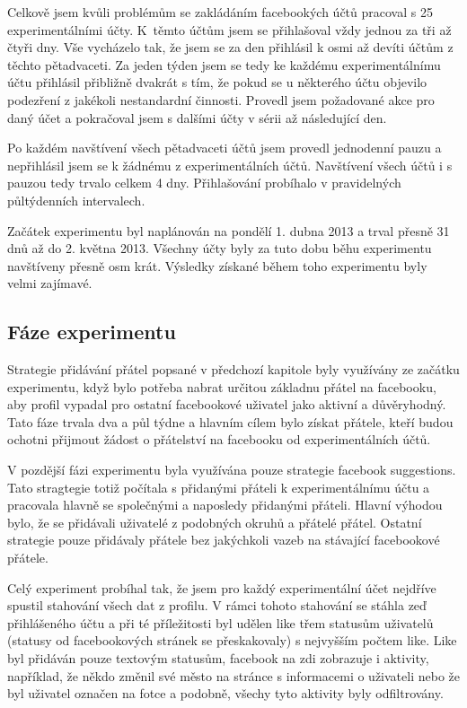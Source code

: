 \documentclass[thesis=M,czech]{FITthesis}[2013/05/10]
\begin{document}
Celkově jsem kvůli problémům se zakládáním facebookých účtů pracoval s 25 experimentálními účty. K~těmto účtům jsem se přihlašoval vždy jednou za tři až čtyři dny. Vše vycházelo tak, že jsem se za den přihlásil k osmi až devíti účtům z těchto pětadvaceti. Za jeden týden jsem se tedy ke každému experimentálnímu účtu přihlásil přibližně dvakrát s tím, že pokud se u některého účtu objevilo podezření z jakékoli nestandardní činnosti. Provedl jsem požadované akce pro daný účet a pokračoval jsem s dalšími účty v sérii až následující den.

Po každém navštívení všech pětadvaceti účtů jsem provedl jednodenní pauzu a nepřihlásil jsem se k žádnému z experimentálních účtů. Navštívení všech účtů i s pauzou tedy trvalo celkem 4 dny. Přihlašování probíhalo v pravidelných půltýdenních intervalech.

Začátek experimentu byl naplánován na pondělí 1. dubna 2013 a trval přesně 31 dnů až do 2. května 2013. Všechny účty byly za tuto dobu běhu experimentu navštíveny přesně osm krát. Výsledky získané během toho experimentu byly velmi zajímavé.

\subsection{Fáze experimentu}

Strategie přidávání přátel popsané v předchozí kapitole byly využívány ze začátku experimentu, když bylo potřeba nabrat určitou základnu přátel na facebooku, aby profil vypadal pro ostatní facebookové uživatel jako aktivní a důvěryhodný. Tato fáze trvala dva a půl týdne a hlavním cílem bylo získat přátele, kteří budou ochotni přijmout žádost o přátelství na facebooku od experimentálních účtů. 

V pozdější fázi experimentu byla využívána pouze strategie facebook suggestions. Tato stragtegie totiž počítala s přidanými přáteli k experimentálnímu účtu a pracovala hlavně se společnými a naposledy přidanými přáteli. Hlavní výhodou bylo, že se přidávali uživatelé z podobných okruhů a přátelé přátel. Ostatní strategie pouze přidávaly přátele bez jakýchkoli vazeb na stávající facebookové přátele. 

Celý experiment probíhal tak, že jsem pro každý experimentální účet nejdříve spustil stahování všech dat z profilu. V rámci tohoto stahování se stáhla zeď přihlášeného účtu a při té příležitosti byl udělen like třem statusům uživatelů (statusy od facebookových stránek se přeskakovaly) s nejvyšším počtem like. Like byl přidáván pouze textovým statusům, facebook na zdi zobrazuje i aktivity, například, že někdo změnil své město na stránce s informacemi o uživateli nebo že byl uživatel označen na fotce a podobně, všechy tyto aktivity byly odfiltrovány. 
\end{document}
